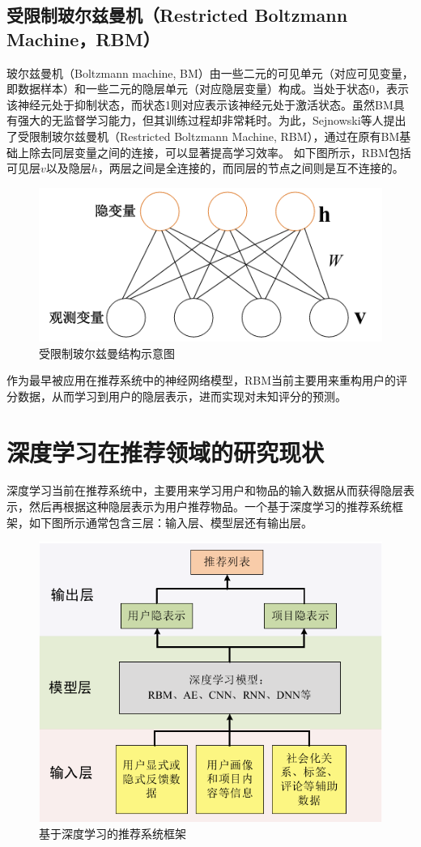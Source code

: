 \subsection{受限制玻尔兹曼机（Restricted Boltzmann Machine，RBM）} 
玻尔兹曼机（Boltzmann machine, BM）由一些二元的可见单元（对应可见变量，即数据样本）和一些二元的隐层单元（对应隐层变量）构成。当处于状态0，表示该神经元处于抑制状态，而状态1则对应表示该神经元处于激活状态。虽然BM具有强大的无监督学习能力，但其训练过程却非常耗时。为此，Sejnowski等人提出了受限制玻尔兹曼机（Restricted Boltzmann Machine, RBM），通过在原有BM基础上除去同层变量之间的连接，可以显著提高学习效率。
如下图所示，RBM包括可见层$v$以及隐层$h$，两层之间是全连接的，而同层的节点之间则是互不连接的。

\begin{figure}[htbp]
\centering
\includegraphics[width=0.5\linewidth]{images/RBM.png}
\caption{受限制玻尔兹曼结构示意图}
\label{fig:fig5}
\end{figure}

作为最早被应用在推荐系统中的神经网络模型\cite{MelloZS07aRBMCF}\cite{TruyenPV09BMCF}，RBM当前主要用来重构用户的评分数据，从而学习到用户的隐层表示，进而实现对未知评分的预测。

\section{深度学习在推荐领域的研究现状}
深度学习当前在推荐系统中，主要用来学习用户和物品的输入数据从而获得隐层表示，然后再根据这种隐层表示为用户推荐物品。一个基于深度学习的推荐系统框架，如下图所示通常包含三层：输入层、模型层还有输出层。

\begin{figure}[htbp]
\centering
\includegraphics[width=0.5\linewidth]{images/DLframework.png}
\caption{基于深度学习的推荐系统框架}
\label{fig:fig1}
\end{figure}


